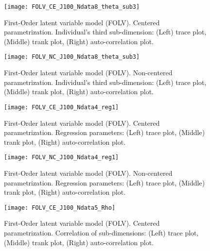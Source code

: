 %
\begin{figure}[H]
	\centering
	\texttt{[image: FOLV\_CE\_J100\_Ndata8\_theta\_sub3]}
	\caption[First-Order latent variable model (FOLV). Centered parametrization. Individual's third sub-dimension. Trace, trank and auto-correlation plots.]%
	{First-Order latent variable model (FOLV). Centered parametrization. Individual's third sub-dimension: (Left) trace plot, (Middle) trank plot, (Right) auto-correlation plot.}
	\label{fig:FOLV_CE_chains6}
\end{figure}
%
\begin{figure}[H]
	\centering
	\texttt{[image: FOLV\_NC\_J100\_Ndata8\_theta\_sub3]}
	\caption[First-Order latent variable model (FOLV). Non-centered parametrization. Individual's third sub-dimension. Trace, trank and auto-correlation plots.]%
	{First-Order latent variable model (FOLV). Non-centered parametrization. Individual's third sub-dimension: (Left) trace plot, (Middle) trank plot, (Right) auto-correlation plot.}
	\label{fig:FOLV_NC_chains6}
\end{figure}
%
\begin{figure}[H]
	\centering
	\texttt{[image: FOLV\_CE\_J100\_Ndata4\_reg1]}
	\caption[First-Order latent variable model (FOLV). Centered parametrization. Regression parameters. Trace, trank and auto-correlation plots.]%
	{First-Order latent variable model (FOLV). Centered parametrization. Regression parameters: (Left) trace plot, (Middle) trank plot, (Right) auto-correlation plot.}
	\label{fig:FOLV_CE_chains7}
\end{figure}
%
\begin{figure}[H]
	\centering
	\texttt{[image: FOLV\_NC\_J100\_Ndata4\_reg1]}
	\caption[First-Order latent variable model (FOLV). Non-centered parametrization. Regression parameters. Trace, trank and auto-correlation plots.]%
	{First-Order latent variable model (FOLV). Non-centered parametrization. Regression parameters: (Left) trace plot, (Middle) trank plot, (Right) auto-correlation plot.}
	\label{fig:FOLV_NC_chains7}
\end{figure}
%
\begin{figure}[H]
	\centering
	\texttt{[image: FOLV\_CE\_J100\_Ndata5\_Rho]}
	\caption[First-Order latent variable model (FOLV). Centered parametrization. Correlation of sub-dimensions. Trace, trank and auto-correlation plots.]%
	{First-Order latent variable model (FOLV). Centered parametrization. Correlation of sub-dimensions: (Left) trace plot, (Middle) trank plot, (Right) auto-correlation plot.}
	\label{fig:FOLV_CE_chains8}
\end{figure}

